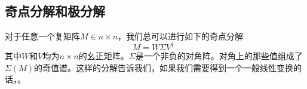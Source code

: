 


\subsection{奇点分解和极分解}
对于任意一个复矩阵$M\in n\times n$，我们总可以进行如下的奇点分解
\begin{equation}
M=W \Sigma V^{\dagger}~.
\end{equation}
其中$W$和$V$均为$n\times n$的幺正矩阵。$\Sigma$是一个非负的对角阵。对角上的那些值组成了$\Sigma(M)$的奇值谱。这样的分解告诉我们，如果我们需要得到一个一般线性变换的话，。



